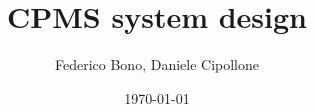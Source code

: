 \documentclass[a4paper]{report}
\begin{document}
\titleformat{\chapter}[hang] 
{\normalfont\huge\bfseries}{\thechapter}{1em}{} 

\title{CPMS system design}
\author{Federico Bono, Daniele Cipollone}
\date{\today}

\newcommand\descitem[1]{\item{\bfseries #1}\\}




\tableofcontents
\listoffigures
\restoregeometry








\end{document}
